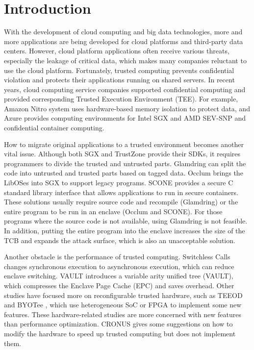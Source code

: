 \section{Introduction}
With the development of cloud computing and big data technologies,
more and more applications are being developed for cloud platforms
and third-party data centers. However, cloud platform applications
often receive various threats, especially the leakage of critical data,
which makes many companies reluctant to use the cloud platform.
Fortunately, trusted computing prevents confidential violation and
protects their applications running on shared servers.
In recent years, cloud computing service companies supported confidential
computing and provided corresponding Trusted Execution Environment (TEE).
For example, Amazon Nitro system \cite{AmazonNitro} uses hardware-based memory
isolation to protect data, and Azure \cite{AzureDocs} provides computing environments
for Intel SGX and AMD SEV-SNP and confidential container computing.

How to migrate original applications to a trusted environment becomes another
vital issue. Although both SGX and TrustZone provide their SDKs,
it requires programmers to divide the trusted and untrusted parts.
Glamdring \cite{Lind2017GlamdringAA} can split the code into untrusted and
trusted parts based on tagged data. Occlum \cite{Shen2020OcclumSA} brings
the LibOSes into SGX to support legacy programs. SCONE \cite{Arnautov2016SCONESL}
provides a secure C standard library interface that allows applications to
run in secure containers. 
These solutions usually require source code and recompile (Glamdring) or
the entire program to be run in an enclave (Occlum and SCONE).
For those programs where the source code is not available,
using Glamdring is not feasible.
In addition, putting the entire program into the enclave increases
the size of the TCB and expands the attack surface,
which is also an unacceptable solution.

Another obstacle is the performance of trusted computing.
Switchless Calls \cite{Tian2018SwitchlessCM} changes synchronous execution
to asynchronous execution, which can reduce enclave switching.
VAULT \cite{Taassori2018VAULTRP} introduces a variable arity unified tree (VAULT),
which compresses the Enclave Page Cache (EPC) and saves overhead.
Other studies have focused more on reconfigurable trusted hardware,
such as TEEOD \cite{Pereira2021TowardsAT} and BYOTee \cite{Armanuzzaman2022BYOTeeTB},
which use heterogeneous SoC or FPGA to implement some new features.
These hardware-related studies are more concerned with new features than
performance optimization. CRONUS \cite{Jiang2022CRONUSFS} gives some suggestions
on how to modify the hardware to speed up trusted computing but does not
implement them.

